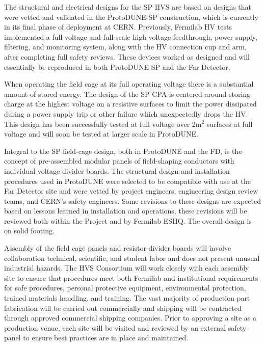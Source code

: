 The structural and electrical designs for the SP HVS are based on designs that were vetted and validated in the ProtoDUNE-SP construction, which is currently in its final phase of deployment at CERN. Previously, Fermilab HV tests implemented a full-voltage and full-scale high voltage feedthrough, power supply, filtering, and monitoring system, along with the HV connection cup and arm, after completing full safety reviews. These devices worked as designed and will essentially be reproduced in both ProtoDUNE-SP and the Far Detector. 

When operating the field cage at its full operating voltage there is a substantial amount of stored energy. The design of the SP CPA is centered around storing charge  at the highest voltage on a resistive surfaces to limit the power dissipated during a power supply trip or other failure which unexpectedly drops the HV. This design has been successfully tested at full voltage over 2m$^2$ surfaces at full voltage and will soon be tested at larger scale in ProtoDUNE.  

Integral to the SP field-cage design, both in ProtoDUNE and the FD, is the concept of pre-assembled modular panels of field-shaping conductors with individual voltage divider boards. The structural design and installation procedures used in ProtoDUNE were selected to be compatible with use at the Far Detector site and were vetted by project engineers, engineering design review teams, and CERN's safety engineers. Some revisions to these designs are expected based on lessons learned in installation and operations, these revisions will be reviewed both within the Project and by Fermilab ESHQ. The overall design is on solid footing. 

Assembly of the field cage panels and resistor-divider boards will involve collaboration technical, scientific, and student labor and  does not present unusual industrial hazards. The HVS Consortium will work closely with each assembly site to ensure that procedures meet both Fermilab and institutional requirements for safe procedures, personal protective equipment, environmental protection, trained materials handling, and training. The vast majority of production part fabrication will be carried out commercially and shipping will be contracted through approved commercial shipping companies. Prior to approving a site as a production venue, each site will be visited and reviewed by an external safety panel to ensure best practices are in place and maintained. 

